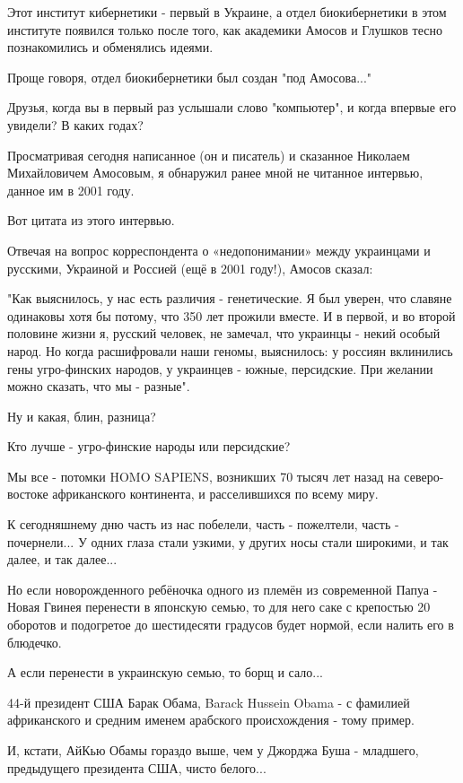 Этот институт кибернетики - первый в Украине, а отдел биокибернетики в этом
институте появился только после того, как академики Амосов и Глушков тесно
познакомились и обменялись идеями.

Проще говоря, отдел биокибернетики был создан "под Амосова..." 🙂

Друзья, когда вы в первый раз услышали слово "компьютер", и когда впервые его
увидели? В каких годах?


Просматривая сегодня написанное (он и писатель) и сказанное Николаем
Михайловичем Амосовым, я обнаружил ранее мной не читанное интервью, данное им в
2001 году.

Вот цитата из этого интервью.

Отвечая на вопрос корреспондента о «недопонимании» между украинцами и русскими,
Украиной и Россией (ещё в 2001 году!), Амосов сказал:

"Как выяснилось, у нас есть различия - генетические. Я был уверен, что славяне
одинаковы хотя бы потому, что 350 лет прожили вместе. И в первой, и во второй
половине жизни я, русский человек, не замечал, что украинцы - некий особый
народ. Но когда расшифровали наши геномы, выяснилось: у россиян вклинились гены
угро-финских народов, у украинцев - южные, персидские. При желании можно
сказать, что мы - разные".

Ну и какая, блин, разница?

Кто лучше - угро-финские народы или персидские?

Мы все - потомки HOMO SAPIENS, возникших 70 тысяч лет назад на северо-востоке
африканского континента, и расселившихся по всему миру.

К сегодняшнему дню часть из нас побелели, часть - пожелтели, часть -
почернели... У одних глаза стали узкими, у других носы стали широкими, и так
далее, и так далее...

Но если новорожденного ребёночка одного из племён из современной Папуа - Новая
Гвинея перенести в японскую семью, то для него саке с крепостью 20 оборотов и
подогретое до шестидесяти градусов будет нормой, если налить его в блюдечко.

А если перенести в украинскую семью, то борщ и сало... 🙂

44-й президент США Барак Обама, Barack Hussein Obama - с фамилией африканского
и средним именем арабского происхождения - тому пример.

И, кстати, АйКью Обамы гораздо выше, чем у Джорджа Буша - младшего, предыдущего
президента США, чисто белого...

